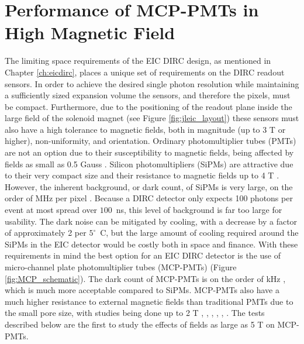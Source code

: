 \section{Performance of MCP-PMTs in High Magnetic Field}
The limiting space requirements of the EIC DIRC design, as mentioned in Chapter \ref{ch:eicdirc}, places a unique set of requirements on the DIRC readout sensors. In order to achieve the desired single photon resolution while maintaining a sufficiently sized expansion volume the sensors, and therefore the pixels, must be compact. Furthermore, due to the positioning of the readout plane inside the large field of the solenoid magnet (see Figure \ref{fig:jleic_layout}) these sensors must also have a high tolerance to magnetic fields, both in magnitude (up to 3 T or higher), non-uniformity, and orientation. Ordinary photomultiplier tubes (PMTs) are not an option due to their susceptibility to magnetic fields, being affected by fields as small as 0.5 Gauss \cite{PMT_magnet}. Silicon photomultipliers (SiPMs) are attractive due to their very compact size and their resistance to magnetic fields up to 4 T \cite{SiPM_characterization}. However, the inherent background, or dark count, of SiPMs is very large, on the order of MHz per pixel \cite{SiPM_characterization} \cite{HamamatsuSiPM}. Because a DIRC detector only expects 100 photons per event at most spread over $100$~ns, this level of background is far too large for usability. The dark noise can be mitigated by cooling, with a decrease by a factor of approximately 2 per $5^\circ$~C, but the large amount of cooling required around the SiPMs in the EIC detector would be costly both in space and finance. With these requirements in mind the best option for an EIC DIRC detector is the use of micro-channel plate photomultiplier tubes (MCP-PMTs) (Figure \ref{fig:MCP_schematic}). The dark count of MCP-PMTs is on the order of kHz \cite{MCPPMT_darkcount}, which is much more acceptable compared to SiPMs. MCP-PMTs also have a much higher resistance to external magnetic fields than traditional PMTs due to the small pore size, with studies being done up to 2 T \cite{MCPTest1}, \cite{MCPTest2}, \cite{MCPTest3}, \cite{MCPTest4}, \cite{MCPTest5}, \cite{MCPTest6}. The tests described below are the first to study the effects of fields as large as 5 T on MCP-PMTs.

